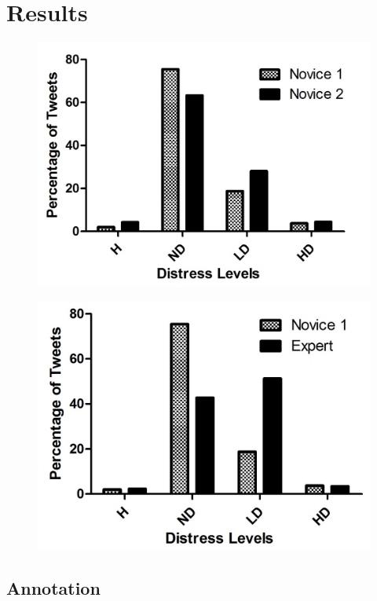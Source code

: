 \documentclass[11pt]{article}
\begin{document}
\section{Results}
\begin{figure}
\centering
\includegraphics[scale=0.7]{ChrisCissi4cat.jpg}
\end{figure}

\begin{figure}
\centering
\includegraphics[scale=0.7]{ChrisMegan4Cat.jpg}
\end{figure}

\subsection{Annotation}
\end{document}
